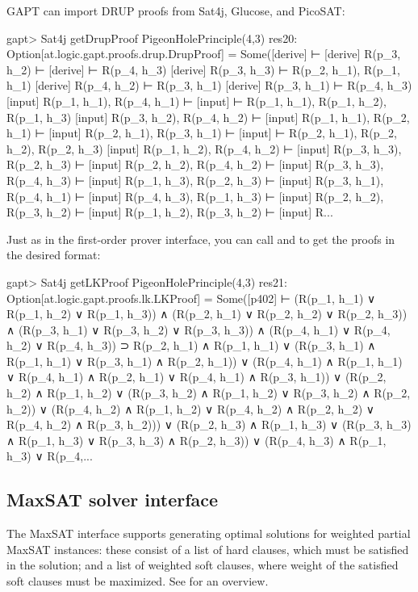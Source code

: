\documentclass[a4paper,11pt]{article}
\newcommand{\cli}[1]{{\ttfamily {#1}}}
\begin{document}
GAPT can import DRUP proofs from Sat4j, Glucose, and PicoSAT:
\begin{clilisting}
gapt> Sat4j getDrupProof PigeonHolePrinciple(4,3)
res20: Option[at.logic.gapt.proofs.drup.DrupProof] =
Some([derive]  ⊢
[derive] R(p_3, h_2) ⊢
[derive]  ⊢ R(p_4, h_3)
[derive] R(p_3, h_3) ⊢ R(p_2, h_1), R(p_1, h_1)
[derive] R(p_4, h_2) ⊢ R(p_3, h_1)
[derive] R(p_3, h_1) ⊢ R(p_4, h_3)
[input] R(p_1, h_1), R(p_4, h_1) ⊢
[input]  ⊢ R(p_1, h_1), R(p_1, h_2), R(p_1, h_3)
[input] R(p_3, h_2), R(p_4, h_2) ⊢
[input] R(p_1, h_1), R(p_2, h_1) ⊢
[input] R(p_2, h_1), R(p_3, h_1) ⊢
[input]  ⊢ R(p_2, h_1), R(p_2, h_2), R(p_2, h_3)
[input] R(p_1, h_2), R(p_4, h_2) ⊢
[input] R(p_3, h_3), R(p_2, h_3) ⊢
[input] R(p_2, h_2), R(p_4, h_2) ⊢
[input] R(p_3, h_3), R(p_4, h_3) ⊢
[input] R(p_1, h_3), R(p_2, h_3) ⊢
[input] R(p_3, h_1), R(p_4, h_1) ⊢
[input] R(p_4, h_3), R(p_1, h_3) ⊢
[input] R(p_2, h_2), R(p_3, h_2) ⊢
[input] R(p_1, h_2), R(p_3, h_2) ⊢
[input] R...
\end{clilisting}

Just as in the first-order prover interface, you can call
\cli{getResolutionProof} and \cli{getLKProof} to get the proofs in the desired
format:
\begin{clilisting}
gapt> Sat4j getLKProof PigeonHolePrinciple(4,3)
res21: Option[at.logic.gapt.proofs.lk.LKProof] =
Some([p402]
⊢
(R(p_1, h_1) ∨ R(p_1, h_2) ∨ R(p_1, h_3)) ∧
    (R(p_2, h_1) ∨ R(p_2, h_2) ∨ R(p_2, h_3)) ∧
    (R(p_3, h_1) ∨ R(p_3, h_2) ∨ R(p_3, h_3)) ∧
    (R(p_4, h_1) ∨ R(p_4, h_2) ∨ R(p_4, h_3)) ⊃
  R(p_2, h_1) ∧ R(p_1, h_1) ∨
    (R(p_3, h_1) ∧ R(p_1, h_1) ∨ R(p_3, h_1) ∧ R(p_2, h_1)) ∨
    (R(p_4, h_1) ∧ R(p_1, h_1) ∨
      R(p_4, h_1) ∧ R(p_2, h_1) ∨
      R(p_4, h_1) ∧ R(p_3, h_1)) ∨
    (R(p_2, h_2) ∧ R(p_1, h_2) ∨
      (R(p_3, h_2) ∧ R(p_1, h_2) ∨ R(p_3, h_2) ∧ R(p_2, h_2)) ∨
      (R(p_4, h_2) ∧ R(p_1, h_2) ∨
        R(p_4, h_2) ∧ R(p_2, h_2) ∨
        R(p_4, h_2) ∧ R(p_3, h_2))) ∨
    (R(p_2, h_3) ∧ R(p_1, h_3) ∨
      (R(p_3, h_3) ∧ R(p_1, h_3) ∨ R(p_3, h_3) ∧ R(p_2, h_3)) ∨
      (R(p_4, h_3) ∧ R(p_1, h_3) ∨
        R(p_4,...
\end{clilisting}

\subsection{MaxSAT solver interface}

The MaxSAT interface supports generating optimal solutions for weighted partial
MaxSAT instances: these consist of a list of hard clauses, which must be
satisfied in the solution; and a list of weighted soft clauses, where weight of
the satisfied soft clauses must be maximized.  See \cite{Argelich2008First}
for an overview.
\end{document}

